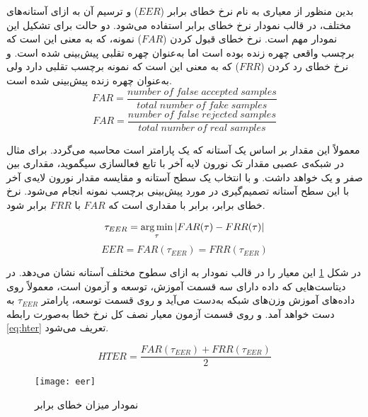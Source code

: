 بدین منظور از معیاری به نام نرخ خطای برابر 
 ($EER$)
و ترسیم آن به ازای آستانه‌های مختلف، در قالب نمودار نرخ خطای برابر استفاده می‌شود. 
دو حالت برای تشکیل این نمودار مهم است. نرخ خطای قبول کردن
 ($FAR$)
 نمونه، که به معنی این است که برچسب واقعی چهره زنده بوده است اما به‌عنوان چهره تقلبی پیش‌بینی شده است. و نرخ خطای رد کردن
  ($FRR$)
  که به معنی این است که نمونه برچسب تقلبی دارد ولی به‌عنوان چهره زنده پیش‌بینی شده است.
\begin{equation} \label{eq:far}
	FAR = \frac{number\; of\; false\; accepted\; samples}{total\; number\; of\; fake\; samples}
\end{equation}
\begin{equation} \label{eq:frr}
	FAR = \frac{number\; of\; false\; rejected\; samples}{total\; number\; of\; real\; samples}
\end{equation}

معمولاً این مقدار بر اساس یک آستانه که یک پارامتر است محاسبه می‌گردد. برای مثال در شبکه‌ی عصبی مقدار تک نورون لایه آخر با تابع فعالسازی سیگموید، مقداری بین صفر و یک خواهد داشت. و با انتخاب یک سطح آستانه و مقایسه مقدار نورون لایه‌ی آخر با این سطح آستانه تصمیم‌گیری در مورد پیش‌بینی برچسب نمونه انجام می‌شود. نرخ خطای برابر، برابر با مقداری است که $FAR$ با $FRR$ برابر شود.

\begin{equation}\label{eq:taueer}
	\tau_{EER} = \operatorname*{arg\,min}_{\tau}|FAR(\tau)-FRR(\tau)|
\end{equation}
\begin{equation}\label{eq:eer}
	EER=FAR(\tau_{EER})=FRR(\tau_{EER})
\end{equation}

در شکل
\ref{fig:eer}
این معیار را در قالب نمودار به ازای سطوح مختلف آستانه نشان می‌دهد. در دیتاست‌هایی که داده دارای سه قسمت آموزش، توسعه و آزمون است، معمولاً روی داده‌های آموزش وزن‌های شبکه به‌دست می‌آید و روی قسمت توسعه، پارامتر  
$\tau_{EER}$
 به دست خواهد آمد. و روی قسمت آزمون معیار نصف کل نرخ خطا
  به‌صورت رابطه
\ref{eq:hter}
تعریف می‌شود.

\begin{equation}\label{eq:hter}
	HTER=\frac{FAR(\tau_{EER})+FRR(\tau_{EER})}{2}
\end{equation}

 \begin{figure}[ht]
	\centerline{\texttt{[image: eer]}}
	\caption{نمودار میزان خطای برابر}
	\label{fig:eer}
\end{figure}

